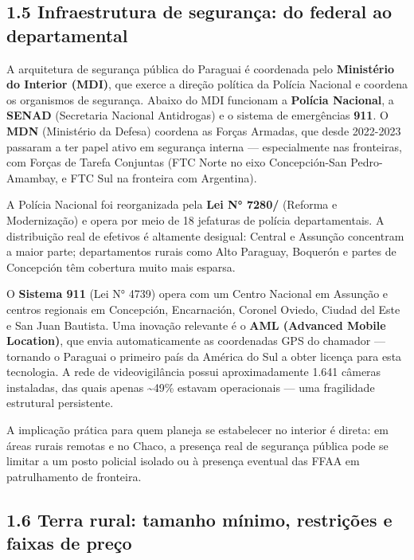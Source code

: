 \subsection{1.5 Infraestrutura de segurança: do federal ao
departamental}\label{infraestrutura-de-seguranuxe7a-do-federal-ao-departamental}

A arquitetura de segurança pública do Paraguai é coordenada pelo
\textbf{Ministério do Interior (MDI)}, que exerce a direção política da
Polícia Nacional e coordena os organismos de segurança. Abaixo do MDI
funcionam a \textbf{Polícia Nacional}, a \textbf{SENAD} (Secretaria
Nacional Antidrogas) e o sistema de emergências \textbf{911}. O
\textbf{MDN} (Ministério da Defesa) coordena as Forças Armadas, que
desde 2022-2023 passaram a ter papel ativo em segurança interna ---
especialmente nas fronteiras, com Forças de Tarefa Conjuntas (FTC Norte
no eixo Concepción-San Pedro-Amambay, e FTC Sul na fronteira com
Argentina).

A Polícia Nacional foi reorganizada pela \textbf{Lei N° 7280/\allowbreak {}}
(Reforma e Modernização) e opera por meio de 18 jefaturas de polícia
departamentais. A distribuição real de efetivos é altamente desigual:
Central e Assunção concentram a maior parte; departamentos rurais como
Alto Paraguay, Boquerón e partes de Concepción têm cobertura muito mais
esparsa.

O \textbf{Sistema 911} (Lei N° 4739) opera com um Centro Nacional em
Assunção e centros regionais em Concepción, Encarnación, Coronel Oviedo,
Ciudad del Este e San Juan Bautista. Uma inovação relevante é o
\textbf{AML (Advanced Mobile Location)}, que envia automaticamente as
coordenadas GPS do chamador --- tornando o Paraguai o primeiro país da
América do Sul a obter licença para esta tecnologia. A rede de
videovigilância possui aproximadamente 1.641 câmeras instaladas, das
quais apenas \textasciitilde49\% estavam operacionais --- uma
fragilidade estrutural persistente.

A implicação prática para quem planeja se estabelecer no interior é
direta: em áreas rurais remotas e no Chaco, a presença real de segurança
pública pode se limitar a um posto policial isolado ou à presença
eventual das FFAA em patrulhamento de fronteira.

\subsection{1.6 Terra rural: tamanho mínimo, restrições e faixas de
preço}\label{terra-rural-tamanho-muxednimo-restriuxe7uxf5es-e-faixas-de-preuxe7o}

